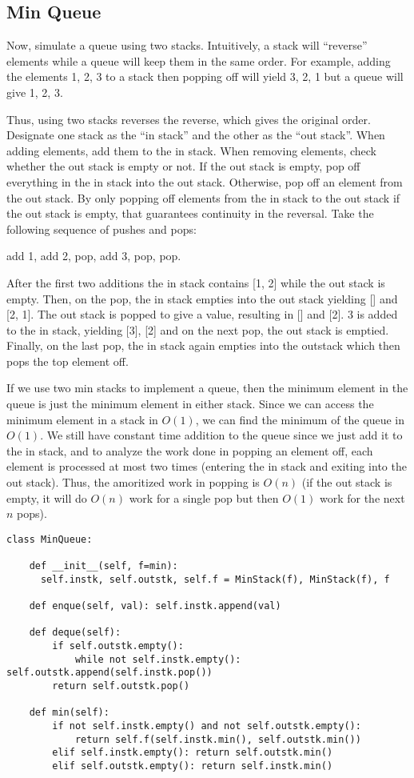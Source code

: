 \documentclass[11pt, oneside]{article}
\begin{document}
\subsection{Min Queue}
Now, simulate a queue using two stacks. Intuitively, a stack will ``reverse'' elements while a queue will keep them in the same order.
For example, adding the elements 1, 2, 3 to a stack then popping off will yield 3, 2, 1 but a queue will give 1, 2, 3.

Thus, using two stacks reverses the reverse, which gives the original order.
Designate one stack as the ``in stack'' and the other as the ``out stack''.
When adding elements, add them to the in stack.
When removing elements, check whether the out stack is empty or not.
If the out stack is empty, pop off everything in the in stack into the out stack.
Otherwise, pop off an element from the out stack. By only popping off elements
from the in stack to the out stack if the out stack is empty, that guarantees
continuity in the reversal. Take the following sequence of pushes and pops:

add 1, add 2, pop, add 3, pop, pop.

After the first two additions the in stack contains [1, 2] while the out stack is empty.
Then, on the pop, the in stack empties into the out stack yielding [] and [2, 1].
The out stack is popped to give a value, resulting in [] and [2]. 3 is added to the in stack,
yielding [3], [2] and on the next pop, the out stack is emptied. Finally, on the last pop,
the in stack again empties into the outstack which then pops the top element off.

If we use two min stacks to implement a queue, then the minimum element in the queue is
just the minimum element in either stack. Since we can access the minimum element in a stack
in \( O(1) \), we can find the minimum of the queue in \( O(1) \).
We still have constant time addition to the queue since we just add it to the in stack,
and to analyze the work done in popping an element off, each element is processed at
most two times (entering the in stack and exiting into the out stack). Thus, the
amoritized work in popping is \( O(n) \) (if the out stack is empty, it will do \( O(n) \) work
for a single pop but then \( O(1) \) work for the next \( n \) pops).

\begin{verbatim}
class MinQueue:

    def __init__(self, f=min):
      self.instk, self.outstk, self.f = MinStack(f), MinStack(f), f

    def enque(self, val): self.instk.append(val)

    def deque(self):
        if self.outstk.empty():
            while not self.instk.empty(): self.outstk.append(self.instk.pop())
        return self.outstk.pop()

    def min(self):
        if not self.instk.empty() and not self.outstk.empty():
            return self.f(self.instk.min(), self.outstk.min())
        elif self.instk.empty(): return self.outstk.min()
        elif self.outstk.empty(): return self.instk.min()
\end{verbatim}
\end{document}
